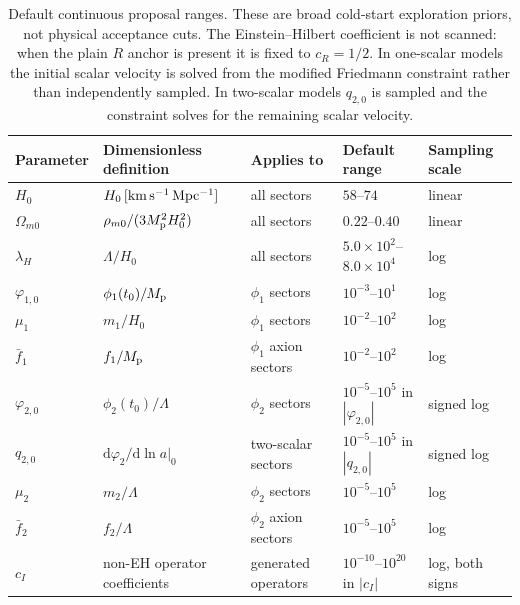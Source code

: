 \documentclass[aps,prd,twocolumn,superscriptaddress,nofootinbib,longbibliography]{revtex4-2}
\newcommand{\dd}{\mathrm{d}}
\newcommand{\Mp}{M_{\rm p}}
\newcommand{\Lam}{\Lambda}
\begin{document}
\begin{table}[t]
\centering
\begin{ruledtabular}
\begin{tabular}{lllll}
Parameter & Dimensionless definition & Applies to & Default range & Sampling scale \\
\hline
$H_0$ & $H_0\,[{\rm km\,s^{-1}\,Mpc^{-1}}]$ & all sectors & $58$--$74$ & linear \\
$\Omega_{m0}$ & $\rho_{m0}/(3\Mp^2H_0^2)$ & all sectors & $0.22$--$0.40$ & linear \\
$\lambda_H$ & $\Lam/H_0$ & all sectors & $5.0\times10^2$--$8.0\times10^4$ & log \\
$\varphi_{1,0}$ & $\phi_1(t_0)/\Mp$ & $\phi_1$ sectors & $10^{-3}$--$10^{1}$ & log \\
$\mu_1$ & $m_1/H_0$ & $\phi_1$ sectors & $10^{-2}$--$10^{2}$ & log \\
$\bar f_1$ & $f_1/\Mp$ & $\phi_1$ axion sectors & $10^{-2}$--$10^{2}$ & log \\
$\varphi_{2,0}$ & $\phi_2(t_0)/\Lam$ & $\phi_2$ sectors & $10^{-5}$--$10^{5}$ in $|\varphi_{2,0}|$ & signed log \\
$q_{2,0}$ & $\dd\varphi_2/\dd\ln a|_{0}$ & two-scalar sectors & $10^{-5}$--$10^{5}$ in $|q_{2,0}|$ & signed log \\
$\mu_2$ & $m_2/\Lam$ & $\phi_2$ sectors & $10^{-5}$--$10^{5}$ & log \\
$\bar f_2$ & $f_2/\Lam$ & $\phi_2$ axion sectors & $10^{-5}$--$10^{5}$ & log \\
$c_I$ & non-EH operator coefficients & generated operators & $10^{-10}$--$10^{20}$ in $|c_I|$ & log, both signs \\
\end{tabular}
\end{ruledtabular}
\caption{Default continuous proposal ranges.  These are broad cold-start exploration priors, not physical acceptance cuts.  The Einstein--Hilbert coefficient is not scanned: when the plain $R$ anchor is present it is fixed to $c_R=1/2$.  In one-scalar models the initial scalar velocity is solved from the modified Friedmann constraint rather than independently sampled.  In two-scalar models $q_{2,0}$ is sampled and the constraint solves for the remaining scalar velocity.}
\label{tab:parameter-priors}
\end{table}
\end{document}

